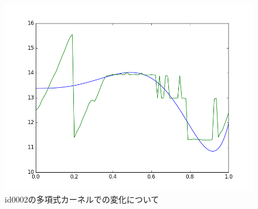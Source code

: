 \documentclass[]{jsarticle}
\begin{document}
\begin{figure}[htbp]
\begin{minipage}[b]{0.5\hsize}
  \includegraphics[scale=0.4]{./images/02polym001c.png}
 \end{minipage}
 \caption{ id0002の多項式カーネルでの変化について}
\end{figure}
\end{document}

